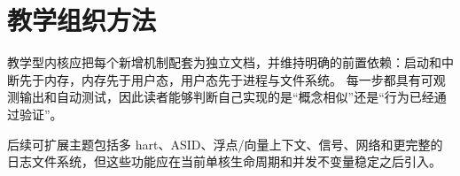 \section{教学组织方法}

教学型内核应把每个新增机制配套为独立文档，并维持明确的前置依赖：启动和中断先于内存，内存先于用户态，用户态先于进程与文件系统。
每一步都具有可观测输出和自动测试，因此读者能够判断自己实现的是“概念相似”还是“行为已经通过验证”。

后续可扩展主题包括多 hart、ASID、浮点/向量上下文、信号、网络和更完整的日志文件系统，但这些功能应在当前单核生命周期和并发不变量稳定之后引入。
